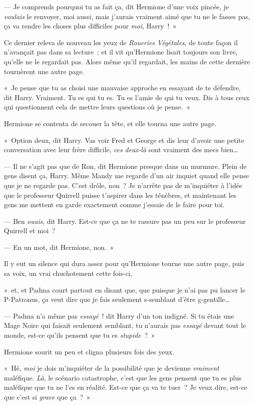 --- Je comprends pourquoi tu as fait ça, dit Hermione d'une voix pincée, je \emph{voulais} le renvoyer, moi aussi, mais j'aurais vraiment aimé que tu ne le fasses pas, ça va rendre les choses plus difficiles pour \emph{moi}, Harry~!~»

Ce dernier releva de nouveau les yeux de \emph{Roueries Végétales}, de toute façon il n'avançait pas dans sa lecture~; et il vit qu'Hermione lisait toujours son livre, qu'elle ne le regardait pas.
Alors même qu'il regardait, les mains de cette dernière tournèrent une autre page.

«~Je pense que tu as choisi une mauvaise approche en essayant de te défendre, dit Harry.
Vraiment.
Tu es qui tu es.
Tu es l'amie de qui tu veux.
Dis à tous ceux qui questionnent cela de mettre leurs questions où je pense.~»

Hermione se contenta de secouer la tête, et elle tourna une autre page.

«~Option deux, dit Harry.
Vas voir Fred et George et dis leur d'avoir une petite conversation avec leur frère difficile, \emph{ces deux-là} sont vraiment des mecs bien…

--- Il ne s'agit pas que de Ron, dit Hermione presque dans un murmure.
Plein de gens disent ça, Harry.
Même Mandy me regarde d'un air inquiet quand elle pense que je ne regarde pas.
C'est drôle, non~?
Je n'arrête pas de m'inquiéter à l'idée que le professeur Quirrell puisse t'aspirer dans les ténèbres, et maintenant les gens me mettent en garde exactement comme j'essaie de le faire pour toi.

--- Ben \emph{ouais}, dit Harry.
Est-ce que ça ne te rassure pas un peu sur le professeur Quirrell et moi~?

--- En un mot, dit Hermione, non.~»

Il y eut un silence qui dura assez pour qu'Hermione tourne une autre page, puis sa voix, un vrai chuchotement cette fois-ci,

«~et, et Padma court partout en disant que, que puisque je n'ai pas pu lancer le P-Patronus, ça veut dire que je fais seulement s-semblant d'être g-gentille…

--- Padma n'a même pas \emph{essayé}~! dit Harry d'un ton indigné.
Si tu étais une Mage Noire qui faisait seulement semblant, tu n'aurais pas \emph{essayé} devant tout le monde, est-ce qu'ils pensent que tu es \emph{stupide}~?~»

Hermione sourit un peu et cligna plusieurs fois des yeux.

«~Hé, \emph{moi} je dois m'inquiéter de la possibilité que je devienne \emph{vraiment} maléfique.
\emph{Là}, le scénario catastrophe, c'est que les gens pensent que tu es plus maléfique que tu ne l'es en réalité.
Est-ce que ça va te tuer~?
Je veux dire, est-ce que c'est si \emph{grave} que ça~?~»

